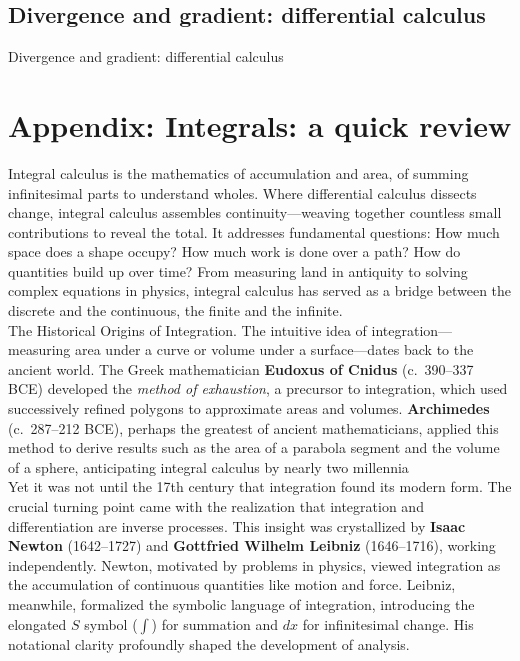 \documentclass{book}
\begin{document}
\section{Divergence and gradient: differential calculus}

Divergence and gradient: differential calculus



\chapter{Appendix: Integrals: a quick review}

Integral calculus is the mathematics of accumulation and area, of summing infinitesimal parts to understand wholes. Where differential calculus dissects change, integral calculus assembles continuity---weaving together countless small contributions to reveal the total. It addresses fundamental questions: How much space does a shape occupy? How much work is done over a path? How do quantities build up over time? From measuring land in antiquity to solving complex equations in physics, integral calculus has served as a bridge between the discrete and the continuous, the finite and the infinite.\\

The Historical Origins of Integration. The intuitive idea of integration—measuring area under a curve or volume under a surface—dates back to the ancient world. The Greek mathematician \textbf{Eudoxus of Cnidus} (c.~390--337 BCE) developed the \emph{method of exhaustion}, a precursor to integration, which used successively refined polygons to approximate areas and volumes. \textbf{Archimedes} (c.~287--212 BCE), perhaps the greatest of ancient mathematicians, applied this method to derive results such as the area of a parabola segment and the volume of a sphere, anticipating integral calculus by nearly two millennia\\

Yet it was not until the 17th century that integration found its modern form. The crucial turning point came with the realization that integration and differentiation are inverse processes. This insight was crystallized by \textbf{Isaac Newton} (1642--1727) and \textbf{Gottfried Wilhelm Leibniz} (1646--1716), working independently. Newton, motivated by problems in physics, viewed integration as the accumulation of continuous quantities like motion and force. Leibniz, meanwhile, formalized the symbolic language of integration, introducing the elongated $S$ symbol ($\int$) for summation and $dx$ for infinitesimal change. His notational clarity profoundly shaped the development of analysis.\\
\end{document}

